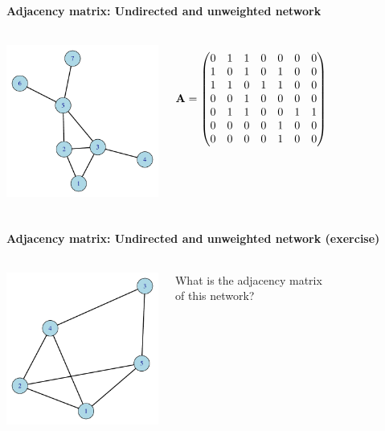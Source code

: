 \documentclass[8pt]{beamer}
\begin{document}
\begin{frame}
\frametitle{\insertsection}
\framesubtitle{Adjacency matrix: Undirected and unweighted network}

\begin{columns}[c]
\centering
\includegraphics[width=5cm]{base}

\centering
\[\mathbf{A} =\left(\begin{array}{@{}ccccccc@{}}
0 & 1 & 1 & 0 & 0 & 0 & 0\\
1 & 0 & 1 & 0 & 1 & 0 & 0\\
1 & 1 & 0 & 1 & 1 & 0 & 0\\
0 & 0 & 1 & 0 & 0 & 0 & 0\\
0 & 1 & 1 & 0 & 0 & 1 & 1\\
0 & 0 & 0 & 0 & 1 & 0 & 0\\
0 & 0 & 0 & 0 & 1 & 0 & 0\\
\end{array}\right)\]

\end{columns}

\end{frame}


\begin{frame}
\frametitle{\insertsection}
\framesubtitle{Adjacency matrix: Undirected and unweighted network (exercise)}

\begin{columns}[c]
\centering
\includegraphics[width=5cm]{adj_exercise}

\centering
What is the adjacency matrix\\
of this network?
\end{columns}

\end{frame}
\end{document}
